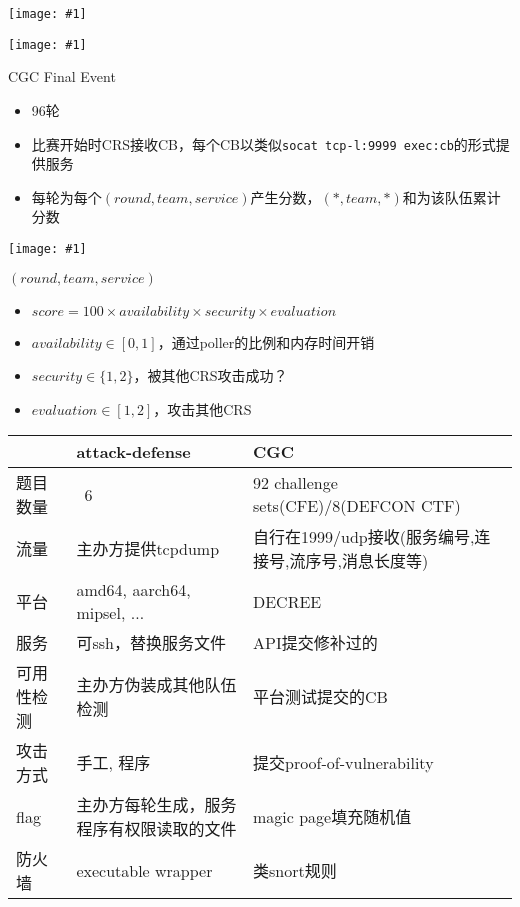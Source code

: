 \documentclass{beamer}
\newcommand{\image}[1]{
  \begin{frame}
    \texttt{[image: \#1]}
  \end{frame}
}
\begin{document}
\image{img/shellphish.jpg}

\image{img/cgc-cfe.jpg}

\begin{frame}
  \begin{block}{CGC Final Event}
    \begin{itemize}
      \item 96轮
      \item 比赛开始时CRS接收CB，每个CB以类似\texttt{socat tcp-l:9999 exec:cb}的形式提供服务
      \item 每轮为每个$(round,team,service)$产生分数，$(*,team,*)$和为该队伍累计分数
    \end{itemize}
  \end{block}
\end{frame}

\image{img/cgc-rack.png}

\begin{frame}
  \begin{block}{$(round,team,service)$}
    \begin{itemize}
      \item $score = 100\times availability\times security\times evaluation$
      \item $availability \in [0,1]$，通过poller的比例和内存时间开销
      \item $security \in \{1,2\}$，被其他CRS攻击成功？
      \item $evaluation \in [1,2]$，攻击其他CRS
    \end{itemize}
  \end{block}
\end{frame}

\begin{frame}
  \small
  \begin{table}
    \begin{tabularx}{\textwidth}{|l|X|X|}
      \hline
      & attack-defense & CGC \\\hline
      题目数量 & ~6 & 92 challenge sets(CFE)/8(DEFCON CTF) \\\hline
      流量 & 主办方提供tcpdump & 自行在1999/udp接收(服务编号,连接号,流序号,消息长度等) \\\hline
      平台 & amd64, aarch64, mipsel, $\ldots$ & DECREE \\\hline
      服务 & 可ssh，替换服务文件 & API提交修补过的 \\\hline
      可用性检测 & 主办方伪装成其他队伍检测 & 平台测试提交的CB \\\hline
      攻击方式 & 手工, 程序 & 提交proof-of-vulnerability \\\hline
      flag & 主办方每轮生成，服务程序有权限读取的文件 & magic page填充随机值 \\
      防火墙 & executable wrapper & 类snort规则 \\\hline
    \end{tabularx}
  \end{table}
\end{frame}
\end{document}

